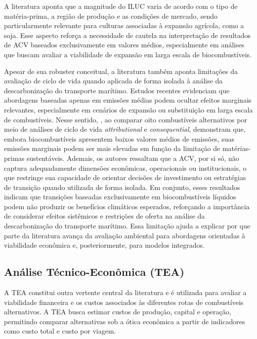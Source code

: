A literatura aponta que a magnitude do ILUC varia de acordo com o tipo de matéria-prima, a região de produção e as condições de mercado, sendo particularmente relevante para culturas associadas à expansão agrícola, como a soja. Esse aspecto reforça a necessidade de cautela na interpretação de resultados de \gls{ACV} baseados exclusivamente em valores médios, especialmente em análises que buscam avaliar a viabilidade de expansão em larga escala de biocombustíveis.

Apesar de sua robustez conceitual, a literatura também aponta limitações da avaliação de ciclo de vida quando aplicada de forma isolada à análise da descarbonização do transporte marítimo. Estudos recentes evidenciam que abordagens baseadas apenas em emissões médias podem ocultar efeitos marginais relevantes, especialmente em cenários de expansão ou substituição em larga escala de combustíveis. Nesse sentido, \citet{krantz_assessing_2023}, ao comparar oito combustíveis alternativos por meio de análises de ciclo de vida \emph{attributional} e \emph{consequential}, demonstram que, embora biocombustíveis apresentem baixos valores médios de emissões, suas emissões marginais podem ser mais elevadas em função da limitação de matérias-primas sustentáveis. Ademais, os autores ressaltam que a \gls{ACV}, por si só, não captura adequadamente dimensões econômicas, operacionais ou institucionais, o que restringe sua capacidade de orientar decisões de investimento ou estratégias de transição quando utilizada de forma isolada. Em conjunto, esses resultados indicam que transições baseadas exclusivamente em biocombustíveis líquidos podem não produzir os benefícios climáticos esperados, reforçando a importância de considerar efeitos sistêmicos e restrições de oferta na análise da descarbonização do transporte marítimo. Essa limitação ajuda a explicar por que parte da literatura avança da avaliação ambiental para abordagens orientadas à viabilidade econômica e, posteriormente, para modelos integrados.

\subsection{Análise Técnico-Econômica (TEA)}

A \gls{TEA} constitui outra vertente central da literatura e é utilizada para avaliar a viabilidade financeira e os custos associados às diferentes rotas de combustíveis alternativos. A \gls{TEA} busca estimar custos de produção, capital e operação, permitindo comparar alternativas sob a ótica econômica a partir de indicadores como custo total e custo por viagem.

